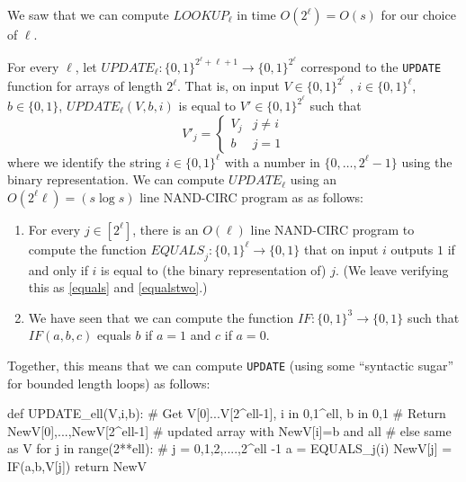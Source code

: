 
We saw that we can compute \(\ensuremath{\mathit{LOOKUP}}_\ell\) in time
\(O(2^\ell) = O(s)\) for our choice of \(\ell\).

For every \(\ell\), let
\(\ensuremath{\mathit{UPDATE}}_\ell:\{0,1\}^{2^\ell + \ell +1} \rightarrow \{0,1\}^{2^\ell}\)
correspond to the \texttt{UPDATE} function for arrays of length
\(2^\ell\). That is, on input \(V\in \{0,1\}^{2^\ell}\) ,
\(i\in \{0,1\}^\ell\), \(b\in \{0,1\}\),
\(\ensuremath{\mathit{UPDATE}}_\ell(V,b,i)\) is equal to
\(V' \in \{0,1\}^{2^\ell}\) such that \[
V'_j = \begin{cases} V_j & j \neq i \\ b & j = 1 \end{cases}
\] where we identify the string \(i \in \{0,1\}^\ell\) with a number in
\(\{0,\ldots, 2^{\ell}-1 \}\) using the binary representation. We can
compute \(\ensuremath{\mathit{UPDATE}}_\ell\) using an
\(O(2^\ell \ell)=(s \log s)\) line NAND-CIRC program as as follows:

\begin{enumerate}
\def\labelenumi{\arabic{enumi}.}
\item
  For every \(j\in [2^\ell]\), there is an \(O(\ell)\) line NAND-CIRC
  program to compute the function
  \(\ensuremath{\mathit{EQUALS}}_j: \{0,1\}^\ell \rightarrow \{0,1\}\)
  that on input \(i\) outputs \(1\) if and only if \(i\) is equal to
  (the binary representation of) \(j\). (We leave verifying this as
  \cref{equals} and \cref{equalstwo}.)
\item
  We have seen that we can compute the function
  \(\ensuremath{\mathit{IF}}:\{0,1\}^3 \rightarrow \{0,1\}\) such that
  \(\ensuremath{\mathit{IF}}(a,b,c)\) equals \(b\) if \(a=1\) and \(c\)
  if \(a=0\).
\end{enumerate}

Together, this means that we can compute \texttt{UPDATE} (using some
``syntactic sugar'' for bounded length loops) as follows:

\begin{code}
def UPDATE_ell(V,i,b):
    # Get V[0]...V[2^ell-1], i in {0,1}^ell, b in {0,1}
    # Return NewV[0],...,NewV[2^ell-1]
    # updated array with NewV[i]=b and all
    # else same as V
    for j in range(2**ell): # j = 0,1,2,....,2^ell -1
        a = EQUALS_j(i)
        NewV[j] = IF(a,b,V[j])
    return NewV
\end{code}

